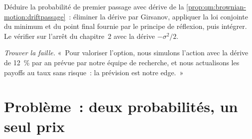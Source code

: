 \begin{exercise}[$\star\star\star$]\label{exo:qm:girsanov-and-changes-of-numeraire:7}
Déduire la probabilité de premier passage avec dérive de la \cref{prop:qm:brownian-motion:driftpassage}~: éliminer
la dérive par Girsanov, appliquer la loi conjointe du minimum et du point final fournie par le principe de réflexion,
puis intégrer. Le vérifier sur l'arrêt du chapitre~2 avec la dérive $-\sigma^2/2$.
\end{exercise}

\begin{exercise}[$\star\star\star$]\label{exo:qm:girsanov-and-changes-of-numeraire:8}
\emph{Trouver la faille.} «~Pour valoriser l'option, nous simulons l'action avec la dérive
de 12~\% par an prévue par notre équipe de recherche, et nous actualisons les payoffs au taux sans risque~: la prévision est
notre edge.~»
\end{exercise}

\section{Problème~: deux probabilités, un seul prix}

